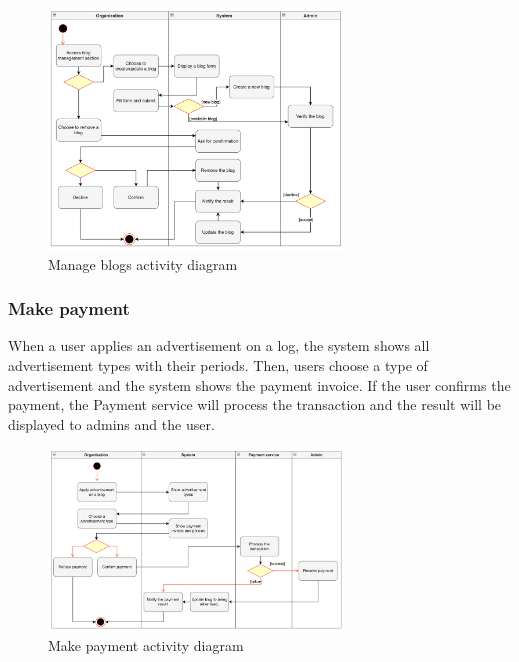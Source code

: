 \begin {figure}[H]
\centering
\includegraphics[width=0.7\textwidth]{Figures/manage_blog_org.png}
\caption{Manage blogs activity diagram}
\label{fig:manage-blog}
\end{figure}


\subsubsection{Make payment}

When a user applies an advertisement on a log, the system shows all advertisement types with their periods. Then, users choose a type of advertisement and the system shows the payment invoice. If the user confirms the payment, the Payment service will process the transaction and the result will be displayed to admins and the user.

\begin {figure}[H]
\centering
\includegraphics[width=0.7\textwidth]{Figures/payment.png}
\caption{Make payment activity diagram}
\label{fig:make-payment}
\end{figure}